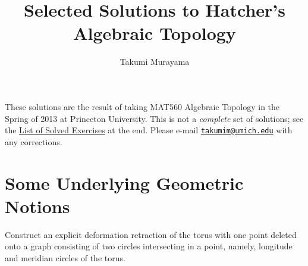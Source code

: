 \documentclass[12pt]{article}
\title{Selected Solutions to Hatcher's Algebraic Topology}
\author{Takumi Murayama}
\theoremstyle{remark}
\begin{document}
\maketitle
These solutions are the result of taking MAT560 Algebraic Topology in the Spring
of 2013 at Princeton University. This is not a \emph{complete} set of solutions; see the \hyperlink{det.1}{List of Solved Exercises} at the end. Please e-mail \href{mailto:takumim@umich.edu}{\nolinkurl{takumim@umich.edu}} with any corrections.
\begingroup
\setlength{\cftsubsecnumwidth}{2.75em}
\endgroup
\newpage
\setcounter{section}{-1}
\section{Some Underlying Geometric Notions}
\begingroup
\renewcommand{\thesubsubsection}{\thesection.\arabic{subsubsection}}
\setcounter{subsubsection}{0}
\begin{problem}
  Construct an explicit deformation retraction of the torus with one point deleted onto a graph consisting of two circles intersecting in a point, namely, longitude and meridian circles of the torus.
\end{problem}
\end{document}
